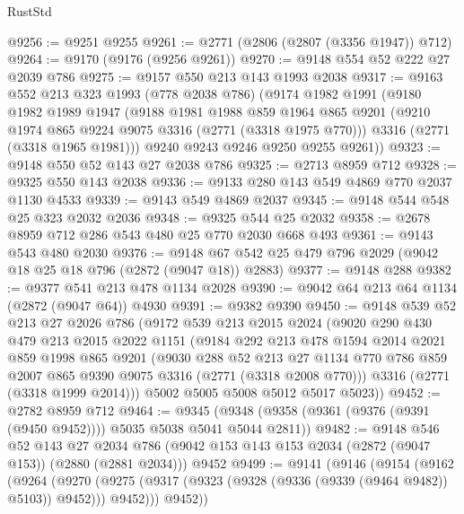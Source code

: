 \begin{lexlean}{RustStd}
\begin{coremodule}
@9256 := @9251 @9255
@9261 := @2771 (@2806 (@2807 (@3356 @1947)) @712)
@9264 := @9170 (@9176 (@9256 @9261))
@9270 := @9148 @554 @52 @222 @27 @2039 @786
@9275 := @9157 @550 @213 @143 @1993 @2038
@9317 := @9163
    @552
    @213
    @323
    @1993
    (@778 @2038 @786)
    (@9174
      @1982
      @1991
      (@9180
        @1982
        @1989
        @1947
        (@9188
          @1981
          @1988
          @859
          @1964
          @865
          @9201
          (@9210 @1974 @865 @9224 @9075 @3316 (@2771 (@3318 @1975 @770)))
          @3316
          (@2771 (@3318 @1965 @1981)))
        @9240
        @9243
        @9246
        @9250
        @9255
        @9261))
@9323 := @9148 @550 @52 @143 @27 @2038 @786
@9325 := @2713 @8959 @712
@9328 := @9325 @550 @143 @2038
@9336 := @9133 @280 @143 @549 @4869 @770 @2037 @1130 @4533
@9339 := @9143 @549 @4869 @2037
@9345 := @9148 @544 @548 @25 @323 @2032 @2036
@9348 := @9325 @544 @25 @2032
@9358 := @2678 @8959 @712 @286 @543 @480 @25 @770 @2030 @668 @493
@9361 := @9143 @543 @480 @2030
@9376 := @9148 @67 @542 @25 @479 @796 @2029 (@9042 @18 @25 @18 @796 (@2872 (@9047 @18)) @2883)
@9377 := @9148 @288
@9382 := @9377 @541 @213 @478 @1134 @2028
@9390 := @9042 @64 @213 @64 @1134 (@2872 (@9047 @64)) @4930
@9391 := @9382 @9390
@9450 := @9148
    @539
    @52
    @213
    @27
    @2026
    @786
    (@9172
      @539
      @213
      @2015
      @2024
      (@9020
        @290
        @430
        @479
        @213
        @2015
        @2022
        @1151
        (@9184
          @292
          @213
          @478
          @1594
          @2014
          @2021
          @859
          @1998
          @865
          @9201
          (@9030
            @288
            @52
            @213
            @27
            @1134
            @770
            @786
            @859
            @2007
            @865
            @9390
            @9075
            @3316
            (@2771 (@3318 @2008 @770)))
          @3316
          (@2771 (@3318 @1999 @2014)))
        @5002
        @5005
        @5008
        @5012
        @5017
        @5023))
@9452 := @2782 @8959 @712
@9464 := @9345 (@9348 (@9358 (@9361 (@9376 (@9391 (@9450 @9452)))) @5035 @5038 @5041 @5044 @2811))
@9482 := @9148
    @546
    @52
    @143
    @27
    @2034
    @786
    (@9042 @153 @143 @153 @2034 (@2872 (@9047 @153)) (@2880 (@2881 @2034)))
    @9452
@9499 := @9141
    (@9146
      (@9154
        (@9162
          (@9264
            (@9270
              (@9275 (@9317 (@9323 (@9328 (@9336 (@9339 (@9464 @9482)) @5103)) @9452)))
              @9452)))
        @9452))

\end{coremodule}
\end{lexlean}
